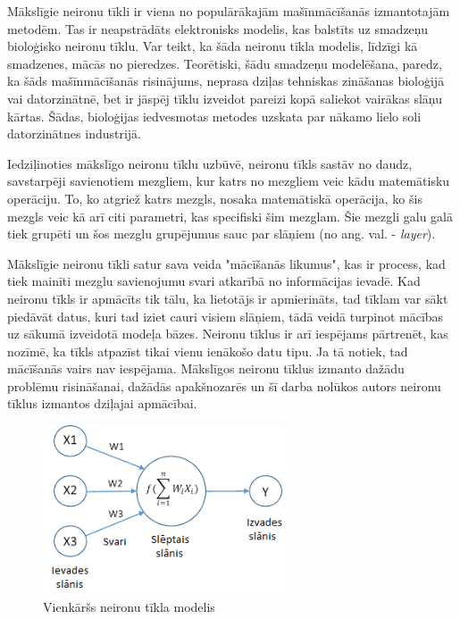 \documentclass[12pt,paper=a4]{report}
\begin{document}
Mākslīgie neironu tīkli ir viena no populārākajām mašīnmācīšanās izmantotajām metodēm. Tas ir neapstrādāts elektronisks modelis, kas balstīts uz smadzeņu bioloģisko neironu tīklu. Var teikt, ka šāda neironu tīkla modelis, līdzīgi kā smadzenes, mācās no pieredzes. Teorētiski, šādu smadzeņu modelēšana, paredz, ka šāds mašīnmācīšanās risinājums, neprasa dziļas tehniskas zināšanas bioloģijā vai datorzinātnē, bet ir jāspēj tīklu izveidot pareizi kopā saliekot vairākas slāņu kārtas. Šādas, bioloģijas iedvesmotas metodes uzskata par nākamo lielo soli datorzinātnes industrijā.\cite{staff} \par
Iedziļinoties mākslīgo neironu tīklu uzbūvē, neironu tīkls sastāv no daudz, savstarpēji savienotiem mezgliem, kur katrs no mezgliem veic kādu matemātisku operāciju. To, ko atgriež katrs mezgls, nosaka matemātiskā operācija, ko šis mezgls veic kā arī citi parametri, kas specifiski šim mezglam. Šie mezgli galu galā tiek grupēti un šos mezglu grupējumus sauc par slāņiem (no ang. val. - \textit{layer}). \par
Mākslīgie neironu tīkli satur sava veida "mācīšanās likumus", kas ir process, kad tiek mainīti mezglu savienojumu svari atkarībā no informācijas ievadē. 
Kad neironu tīkls ir apmācīts tik tālu, ka lietotājs ir apmierināts, tad tīklam var sākt piedāvāt datus, kuri tad iziet cauri visiem slāņiem, tādā veidā turpinot mācības uz sākumā izveidotā modeļa bāzes. Neironu tīklus ir arī iespējams pārtrenēt, kas nozīmē, ka tīkls atpazīst tikai vienu ienākošo datu tipu. Ja tā notiek, tad mācīšanās vairs nav iespējama. Mākslīgos neironu tīklus izmanto dažādu problēmu risināšanai, dažādās apakšnozarēs un šī darba nolūkos autors neironu tīklus izmantos dziļajai apmācībai.
\begin{figure}[h]%
	\centering
	\includegraphics[height=5cm]{images/neironutikls.png} %
	\caption{Vienkāršs neironu tīkla modelis}%
	\label{fig:example}%
\end{figure}
\end{document}
